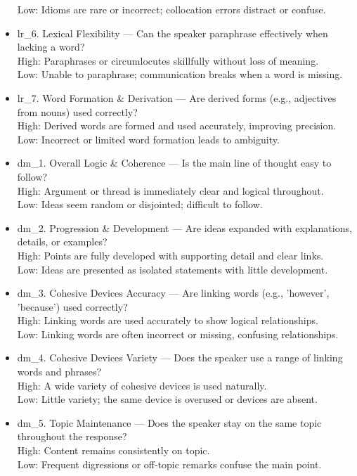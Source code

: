 \documentclass{report}
\begin{document}
\begin{tcolorbox}[breakable, colback=white, colframe=black, title=Revised Question Set Batch Prompt]
\begin{itemize}
    Low: Idioms are rare or incorrect; collocation errors distract or confuse.
  \item lr\_6. Lexical Flexibility — Can the speaker paraphrase effectively when lacking a word?\\
    High: Paraphrases or circumlocutes skillfully without loss of meaning.\\
    Low: Unable to paraphrase; communication breaks when a word is missing.
  \item lr\_7. Word Formation \& Derivation — Are derived forms (e.g., adjectives from nouns) used correctly?\\
    High: Derived words are formed and used accurately, improving precision.\\
    Low: Incorrect or limited word formation leads to ambiguity.
  \item dm\_1. Overall Logic \& Coherence — Is the main line of thought easy to follow?\\
    High: Argument or thread is immediately clear and logical throughout.\\
    Low: Ideas seem random or disjointed; difficult to follow.
  \item dm\_2. Progression \& Development — Are ideas expanded with explanations, details, or examples?\\
    High: Points are fully developed with supporting detail and clear links.\\
    Low: Ideas are presented as isolated statements with little development.
  \item dm\_3. Cohesive Devices Accuracy — Are linking words (e.g., 'however', 'because') used correctly?\\
    High: Linking words are used accurately to show logical relationships.\\
    Low: Linking words are often incorrect or missing, confusing relationships.
  \item dm\_4. Cohesive Devices Variety — Does the speaker use a range of linking words and phrases?\\
    High: A wide variety of cohesive devices is used naturally.\\
    Low: Little variety; the same device is overused or devices are absent.
  \item dm\_5. Topic Maintenance — Does the speaker stay on the same topic throughout the response?\\
    High: Content remains consistently on topic.\\
    Low: Frequent digressions or off‑topic remarks confuse the main point.

\end{itemize}
\end{tcolorbox}
\end{document}
